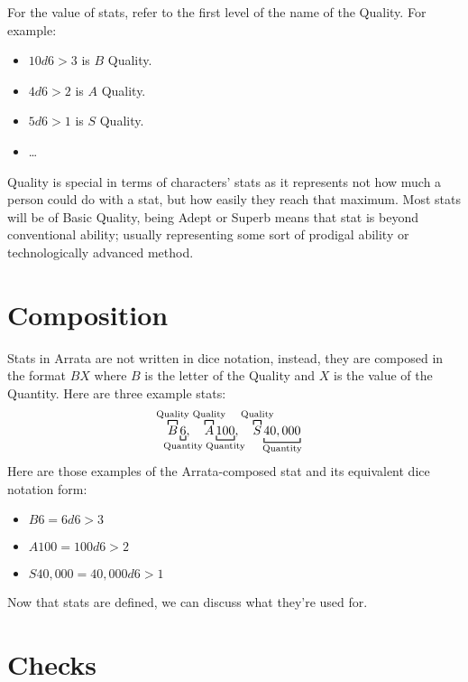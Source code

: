\documentclass[../main.tex]{subfiles}
\begin{document}
    For the value of stats, refer to the first level of the name of the Quality. For example:

    \begin{itemize}
        \item $10d6>3$ is $B$ Quality.
        \item $4d6>2$ is $A$ Quality.
        \item $5d6>1$ is $S$ Quality.
        \item \dots
    \end{itemize}

    Quality is special in terms of characters' stats as it represents not how much a person could do with a stat, but how easily they reach that maximum. Most stats will be of Basic Quality, being Adept or Superb means that stat is beyond conventional ability; usually representing some sort of prodigal ability or technologically advanced method.

    \section{Composition}

    Stats in Arrata are not written in dice notation, instead, they are composed in the format $BX$ where $B$ is the letter of the Quality and $X$ is the value of the Quantity. Here are three example stats:
    \begin{equation*}
        \overbracket[0.75pt]{B}^{\mathclap{\text{Quality}}}
        \underbracket[0.75pt]{6}_{\mathclap{\text{Quantity}}}, \quad
        \overbracket[0.75pt]{A}^{\mathclap{\text{Quality}}}
        \underbracket[0.75pt]{100}_{\mathclap{\text{Quantity}}}, \quad
        \overbracket[0.75pt]{S}^{\mathclap{\text{Quality}}}
        \underbracket[0.75pt]{40,000}_{\mathclap{\text{Quantity}}}
    \end{equation*}
    Here are those examples of the Arrata-composed stat and its equivalent dice notation form:
    
    \begin{itemize}
        \item $B6 = 6d6>3$
        \item $A100 = 100d6>2$
        \item $S40,000 = 40,000d6>1$
    \end{itemize}

    Now that stats are defined, we can discuss what they're used for.

    \section{Checks}
\end{document}
